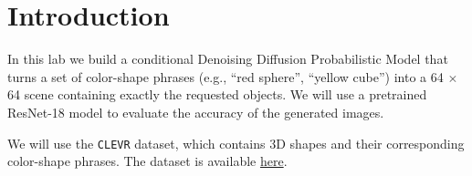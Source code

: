 \section{Introduction}
\label{sec:introduction}

In this lab we build a conditional Denoising Diffusion Probabilistic Model that turns a set of color-shape phrases (e.g., ``red sphere'', ``yellow cube'') into a 64 $\times$ 64 scene containing exactly the requested objects.
We will use a pretrained ResNet-18 model to evaluate the accuracy of the generated images.

We will use the \texttt{CLEVR} dataset, which contains 3D shapes and their corresponding color-shape phrases. The dataset is available \href{https://github.com/facebookresearch/clevr-dataset-gen}{here}.
